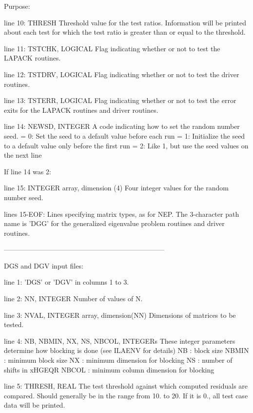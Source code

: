 \begin{DoxyParagraph}{Purpose\+: }
\begin{DoxyVerb}
 line 10: THRESH
          Threshold value for the test ratios.  Information will be
          printed about each test for which the test ratio is greater
          than or equal to the threshold.

 line 11: TSTCHK, LOGICAL
          Flag indicating whether or not to test the LAPACK routines.

 line 12: TSTDRV, LOGICAL
          Flag indicating whether or not to test the driver routines.

 line 13: TSTERR, LOGICAL
          Flag indicating whether or not to test the error exits for
          the LAPACK routines and driver routines.

 line 14: NEWSD, INTEGER
          A code indicating how to set the random number seed.
          = 0:  Set the seed to a default value before each run
          = 1:  Initialize the seed to a default value only before the
                first run
          = 2:  Like 1, but use the seed values on the next line

 If line 14 was 2:

 line 15: INTEGER array, dimension (4)
          Four integer values for the random number seed.

 lines 15-EOF:  Lines specifying matrix types, as for NEP.
          The 3-character path name is 'DGG' for the generalized
          eigenvalue problem routines and driver routines.

-----------------------------------------------------------------------

 DGS and DGV input files:

 line 1:  'DGS' or 'DGV' in columns 1 to 3.

 line 2:  NN, INTEGER
          Number of values of N.

 line 3:  NVAL, INTEGER array, dimension(NN)
          Dimensions of matrices to be tested.

 line 4:  NB, NBMIN, NX, NS, NBCOL, INTEGERs
          These integer parameters determine how blocking is done
          (see ILAENV for details)
          NB     : block size
          NBMIN  : minimum block size
          NX     : minimum dimension for blocking
          NS     : number of shifts in xHGEQR
          NBCOL  : minimum column dimension for blocking

 line 5:  THRESH, REAL
          The test threshold against which computed residuals are
          compared. Should generally be in the range from 10. to 20.
          If it is 0., all test case data will be printed.


\end{DoxyVerb}
\end{DoxyParagraph}
